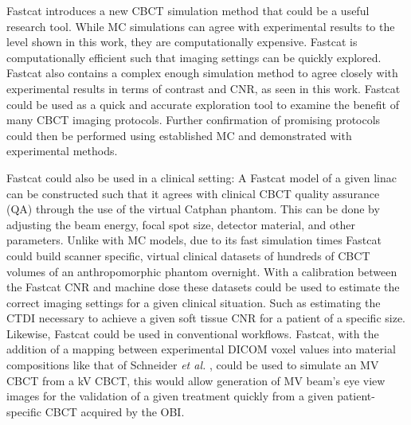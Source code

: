Fastcat introduces a new CBCT simulation method that could be a useful research tool. While MC simulations can agree with experimental results to the level shown in this work, they are computationally expensive. Fastcat is computationally efficient such that imaging settings can be quickly explored. Fastcat also contains a complex enough simulation method to agree closely with experimental results in terms of contrast and CNR, as seen in this work. Fastcat could be used as a quick and accurate exploration tool to examine the benefit of many CBCT imaging protocols. Further confirmation of promising protocols could then be performed using established MC and demonstrated with experimental methods.

Fastcat could also be used in a clinical setting: A Fastcat model of a given linac can be constructed such that it agrees with clinical CBCT quality assurance (QA) through the use of the virtual Catphan phantom. This can be done by adjusting the beam energy, focal spot size, detector material, and other parameters. Unlike with MC models, due to its fast simulation times Fastcat could build scanner specific, virtual clinical datasets of hundreds of CBCT volumes of an anthropomorphic phantom overnight. With a calibration between the Fastcat CNR and machine dose these datasets could be used to estimate the correct imaging settings for a given clinical situation. Such as estimating the CTDI necessary to achieve a given soft tissue CNR for a patient of a specific size. Likewise, Fastcat could be used in conventional workflows. Fastcat, with the addition of a mapping between experimental DICOM voxel values into material compositions like that of Schneider \textit{et al.} \cite{Schneider2000CorrelationDistributions}, could be used to simulate an MV CBCT from a kV CBCT, this would allow generation of MV beam's eye view images for the validation of a given treatment quickly from a given patient-specific CBCT acquired by the OBI.

